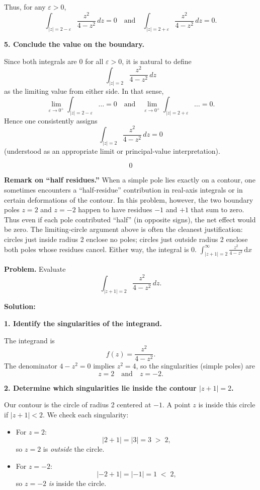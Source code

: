 \documentclass[12pt]{article}
\theoremstyle{definition} %
\theoremstyle{plain} %
\begin{document}
Thus, for any \(\varepsilon>0\),
\[
\int_{\lvert z\rvert=2-\varepsilon} \frac{z^2}{4-z^2}\,dz = 0
\quad\text{and}\quad
\int_{\lvert z\rvert=2+\varepsilon} \frac{z^2}{4-z^2}\,dz = 0.
\]

\textbf{5. Conclude the value on the boundary.}

Since both integrals are \(0\) for all \(\varepsilon>0\), it is natural to define
\[
\int_{\lvert z\rvert=2} \frac{z^2}{4-z^2}\,dz
\]
as the limiting value from either side.  In that sense,
\[
\lim_{\varepsilon\to 0^+} 
\int_{\lvert z\rvert=2-\varepsilon} \dots
= 0
\quad\text{and}\quad
\lim_{\varepsilon\to 0^+}
\int_{\lvert z\rvert=2+\varepsilon} \dots
= 0.
\]
Hence one consistently assigns
\[
\int_{\lvert z\rvert=2} \frac{z^2}{4 - z^2}\,dz = 0
\]
(understood as an appropriate limit or principal-value interpretation).

\[
\boxed{0}
\]

\textbf{Remark on “half residues.”}  
When a simple pole lies exactly on a contour, one sometimes encounters a “half‐residue” contribution in real‐axis integrals or in certain deformations of the contour.  In this problem, however, the two boundary poles \(z=2\) and \(z=-2\) happen to have residues \(-1\) and \(+1\) that sum to zero.  Thus even if each pole contributed “half” (in opposite signs), the net effect would be zero.  The limiting‐circle argument above is often the cleanest justification: circles just inside radius 2 enclose no poles; circles just outside radius 2 enclose both poles whose residues cancel.  Either way, the integral is \(0\).
$\int_{\left\vert z+1 \right\vert=2 }^{\infty} \frac{z^{2}}{4-z^{2}} \,\mathrm{d}x $ 

\textbf{Problem.} Evaluate
\[
\int_{\lvert z+1\rvert=2} \frac{z^2}{4 - z^2}\,dz.
\]

\textbf{Solution:}

\textbf{1. Identify the singularities of the integrand.}

The integrand is
\[
f(z) = \frac{z^2}{4 - z^2}.
\]
The denominator \(4 - z^2 = 0\) implies \(z^2 = 4\), so the singularities (simple poles) are
\[
z = 2
\quad\text{and}\quad
z = -2.
\]

\textbf{2. Determine which singularities lie inside the contour \(\lvert z+1\rvert=2\).}

Our contour is the circle of radius 2 centered at \(-1\).  A point \(z\) is inside this circle if \(\lvert z+1\rvert < 2\).  We check each singularity:

\begin{itemize}
\item For \(z=2\):
\[
\lvert 2 + 1\rvert = \lvert 3\rvert = 3 \;>\; 2,
\]
so \(z=2\) is \emph{outside} the circle.

\item For \(z=-2\):
\[
\lvert -2 + 1\rvert = \lvert -1\rvert = 1 \;<\; 2,
\]
so \(z=-2\) \emph{is} inside the circle.
\end{itemize}
\end{document}
